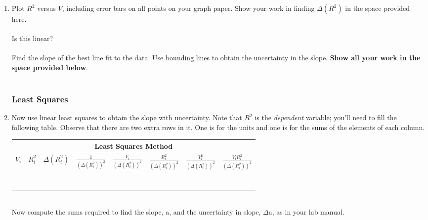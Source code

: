 \begin{enumerate}

\item Plot $R^2$ versus $V$, including error bars on all points
on your graph paper.  Show your work in finding
$\Delta(R^2)$ in the space provided here. \\
\vspace*{2cm} \\
\noindent Is this linear? \\
\vspace*{1cm} \\
\noindent Find the slope of the best 
line fit to the data. Use bounding lines to obtain the uncertainty in the 
slope.  {\bf Show all your work in the space provided below}. \\
\vspace*{8cm} \\

\subsubsection{Least Squares}
\item Now use linear least squares to obtain the slope with uncertainty. Note 
that $R^2$ is the {\it dependent} variable; you'll need to fill the following
table. Observe that there are two extra rows in it. One is for the units and
one is for the sums of the elements of each column. 
\begin{center}
\begin{tabular}{|c|c|c|c|c|c|c|c|}
\hline
\multicolumn{8}{|c|}{Least Squares Method}\\
\hline 
  $V_i$ & $R_i^2$ & $\Delta (R_i^2)$ & $\frac{1}{(\Delta (R_i^2) )^2}$ &
$\frac{V_i}{(\Delta (R_i^2) )^2}$ & $\frac{R_i^2}{(\Delta (R_i^2) )^2}$ & 
$\frac{V_i^2}{(\Delta (R_i^2) )^2}$ & 
$\frac{V_i R_i^2}{(\Delta (R_i^2) )^2}$ \\
\hline
 & &  &  &  &  &  &  \\
\hline
 & &  &  &  &  &  &  \\
\hline
 & &  &  &  &  &  &  \\
\hline
 & &  &  &  &  &  &  \\
\hline
 & &  &  &  &  &  &  \\
\hline
 & &  &  &  &  &  &  \\
\hline
 & &  &  &  &  &  &  \\
\hline
\end{tabular}
\end{center} 
\vfill
\newpage
\ \\
\noindent Now compute the sums required to find the slope, a, and
the uncertainty in slope, $\Delta$a, as in your lab manual. \\
\vfill
\pagebreak


\end{enumerate}
